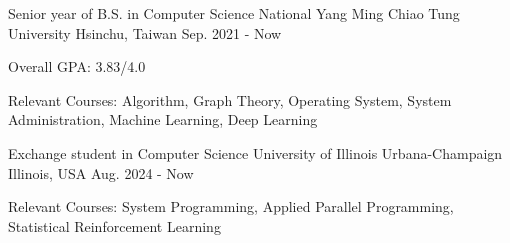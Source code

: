 

\begin{cventries}

  \cventry
    {Senior year of B.S. in Computer Science} %
    {National Yang Ming Chiao Tung University} %
    {Hsinchu, Taiwan} %
    {Sep. 2021 - Now} %
    {
      \begin{cvitems} %
        \item {Overall GPA: 3.83/4.0}
        \item {Relevant Courses: Algorithm, Graph Theory, Operating System, System Administration, Machine Learning, Deep Learning}
      \end{cvitems}
    }

  \cventry
    {Exchange student in Computer Science} %
    {University of Illinois Urbana-Champaign} %
    {Illinois, USA} %
    {Aug. 2024 - Now} %
    {
      \begin{cvitems} %
        \item {Relevant Courses: System Programming, Applied Parallel Programming, Statistical Reinforcement Learning}
      \end{cvitems}
    }

\end{cventries}
